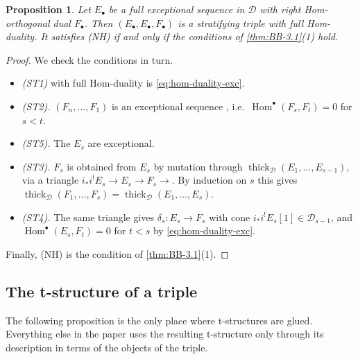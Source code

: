 \documentclass[11pt,reqno]{amsart}
\theoremstyle{plain}
\newtheorem{proposition}[theorem]{Proposition}
\theoremstyle{definition}
\theoremstyle{remark}
\DeclareMathOperator{\Hom}{Hom}
\newcommand{\thick}[2][\cD]{\operatorname{thick}_{#1}(#2)}
\newcommand{\cD}{\mathcal{D}}
\begin{document}
\begin{proposition}\label{prop:exc-dual}
Let $E_\bullet$ be a full exceptional sequence in $\cD$ with right Hom-orthogonal dual $F_\bullet$. Then $(E_\bullet,E_\bullet,F_\bullet)$ is a stratifying triple with full Hom-duality. It satisfies (NH) if and only if the conditions of \cref{thm:BB-3.1}(1) hold.
\end{proposition}

\begin{proof}
We check the conditions in turn.
\begin{itemize}
\item \emph{(ST1)} with full Hom-duality is \eqref{eq:hom-duality-exc}.
\item \emph{(ST2).} $(F_n,\dots,F_1)$ is an exceptional sequence \cite{Bon89}, i.e.\ $\Hom^\bullet(F_s,F_t)=0$ for $s<t$.
\item \emph{(ST5).} The $E_s$ are exceptional.
\item \emph{(ST3).} $F_s$ is obtained from $E_s$ by mutation through $\thick{E_1,\dots,E_{s-1}}$, via a triangle $i_*i^!E_s\to E_s\to F_s\to$. By induction on $s$ this gives $\thick{F_1,\dots,F_s}=\thick{E_1,\dots,E_s}$.
\item \emph{(ST4).} The same triangle gives $\delta_s\colon E_s\to F_s$ with cone $i_*i^!E_s[1]\in\cD_{s-1}$, and $\Hom^\bullet(E_s,F_t)=0$ for $t<s$ by \eqref{eq:hom-duality-exc}.
\end{itemize}
Finally, (NH) is the condition of \cref{thm:BB-3.1}(1).
\end{proof}

\subsection{The t-structure of a triple}
The following proposition is the only place where t-structures are glued. Everything else in the paper uses the resulting t-structure only through its description in terms of the objects of the triple.
\end{document}
